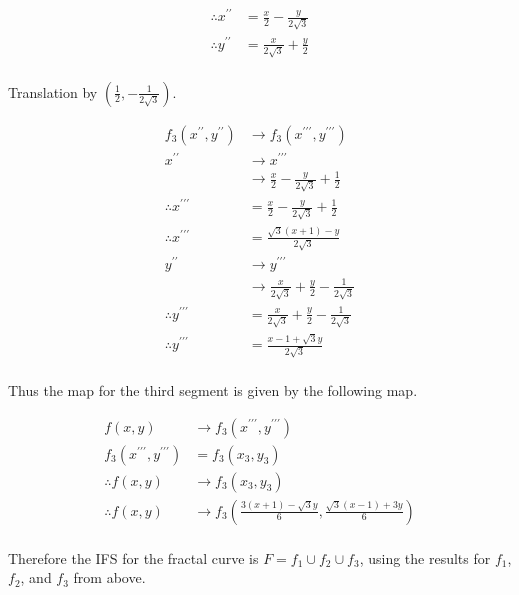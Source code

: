 \documentclass[a4paper]{article}
\begin{document}
\begin{enumerate}[label=\textbf{\arabic*.}]
\begin{enumerate}
		\begin{align*}
		\therefore x^{\prime \prime} & = \frac{x}{2} - \frac{y}{2\sqrt{3}}\\
		\therefore y^{\prime \prime} & = \frac{x}{2\sqrt{3}} + \frac{y}{2}\\
		\end{align*}

		\begin{center}
		Translation by $\left(\frac{1}{2},-\frac{1}{2\sqrt{3}}\right)$.
		\end{center}

		\begin{align*}
		f_3(x^{\prime \prime},y^{\prime \prime}) & \rightarrow f_3(x^{\prime \prime \prime},y^{\prime \prime \prime})\\
		x^{\prime \prime} & \rightarrow x^{\prime \prime \prime}\\
		& \rightarrow \frac{x}{2} - \frac{y}{2\sqrt{3}} + \frac{1}{2}\\
		\therefore x^{\prime \prime \prime} & = \frac{x}{2} - \frac{y}{2\sqrt{3}} + \frac{1}{2}\\
		\therefore x^{\prime \prime \prime} & = \frac{\sqrt{3}(x + 1) - y}{2\sqrt{3}}\\
		y^{\prime \prime} & \rightarrow y^{\prime \prime \prime}\\
		& \rightarrow \frac{x}{2\sqrt{3}} + \frac{y}{2} - \frac{1}{2\sqrt{3}}\\
		\therefore y^{\prime \prime \prime} & = \frac{x}{2\sqrt{3}} + \frac{y}{2} - \frac{1}{2\sqrt{3}}\\
		\therefore y^{\prime \prime \prime} & = \frac{x - 1 + \sqrt{3}y}{2\sqrt{3}}\\
		\end{align*}

		Thus the map for the third segment is given by the following map.

		\begin{align*}
		f(x,y) & \rightarrow f_3(x^{\prime \prime \prime},y^{\prime \prime \prime})\\
		f_3(x^{\prime \prime \prime},y^{\prime \prime \prime})& = f_3(x_3,y_3)\\
		\therefore f(x,y) & \rightarrow f_3(x_3,y_3)\\
		\therefore f(x,y) & \rightarrow f_3\left(\frac{3(x + 1) - \sqrt{3}y}{6},\frac{\sqrt{3}(x - 1) + 3y}{6}\right)\\
		\end{align*}

		Therefore the IFS for the fractal curve is $\displaystyle{F = f_1 \cup f_2 \cup f_3}$, using the results for $f_1$, $f_2$, and $f_3$ from above.


\end{enumerate}
\end{enumerate}
\end{document}
